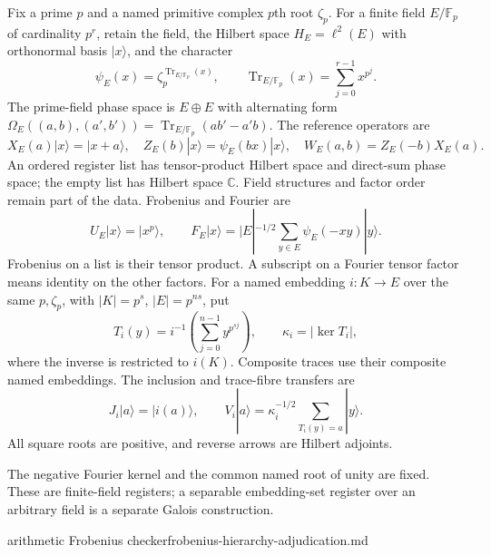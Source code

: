 \begin{definition}
Fix a prime $p$ and a named primitive complex $p$th root $\zeta_p$.
For a finite field $E/\mathbb F_p$ of cardinality $p^r$, retain the field,
the Hilbert space $H_E=\ell^2(E)$ with orthonormal basis $|x\rangle$,
and the character
\[
 \psi_E(x)=\zeta_p^{\operatorname{Tr}_{E/\mathbb F_p}(x)},\qquad
 \operatorname{Tr}_{E/\mathbb F_p}(x)=\sum_{j=0}^{r-1}x^{p^j}.
\]
The prime-field phase space is $E\oplus E$ with alternating form
$\Omega_E((a,b),(a',b'))=\operatorname{Tr}_{E/\mathbb F_p}(ab'-a'b)$.
The reference operators are
\[
 X_E(a)|x\rangle=|x+a\rangle,\quad
 Z_E(b)|x\rangle=\psi_E(bx)|x\rangle,\quad
 W_E(a,b)=Z_E(-b)X_E(a).
\]
An ordered register list has tensor-product Hilbert space and direct-sum
phase space; the empty list has Hilbert space $\mathbb C$. Field structures
and factor order remain part of the data. Frobenius and Fourier are
\[
 U_E|x\rangle=|x^p\rangle,\qquad
 F_E|x\rangle=|E|^{-1/2}\sum_{y\in E}\psi_E(-xy)|y\rangle.
\]
Frobenius on a list is their tensor product. A subscript on a Fourier
tensor factor means identity on the other factors.
For a named embedding $i:K\to E$ over the same $p,\zeta_p$, with
$|K|=p^s$, $|E|=p^{ns}$, put
\[
 T_i(y)=i^{-1}\!\left(\sum_{j=0}^{n-1}y^{p^{sj}}\right),\qquad
 \kappa_i=|\ker T_i|,
\]
where the inverse is restricted to $i(K)$. Composite traces use their
composite named embeddings. The inclusion and trace-fibre transfers are
\[
 J_i|a\rangle=|i(a)\rangle,\qquad
 V_i|a\rangle=\kappa_i^{-1/2}\sum_{T_i(y)=a}|y\rangle.
\]
All square roots are positive, and reverse arrows are Hilbert adjoints.
\end{definition}
\begin{scope}
The negative Fourier kernel and the common named root of unity are fixed.
These are finite-field registers; a separable embedding-set register over
an arbitrary field is a separate Galois construction.
\end{scope}
{arithmetic Frobenius checker}{frobenius-hierarchy-adjudication.md}

